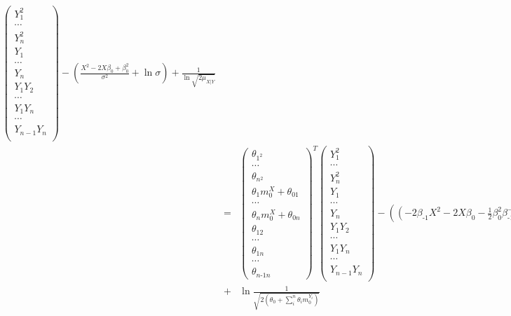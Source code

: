 \documentclass[11pt, oneside]{article}   	%
\numberwithin{figure}{section}
\numberwithin{equation}{section}
\numberwithin{table}{section}
\begin{document}
\begin{itemize}
\begin{eqnarray*}
\begin{pmatrix}
Y_1^2\\
\cdots\\
Y_n^2\\
Y_1\\
\cdots\\
Y_n\\
Y_1 Y_2\\
\cdots\\
Y_1 Y_n\\
\cdots\\
Y_{n-1}Y_{n}\\
\end{pmatrix}
- \left( \frac{X^2 -2X\beta_0 +\beta_0^2}{\sigma^2} + \ln{\sigma} \right) + \frac{1}{\ln{\sqrt{2\mu_{X|Y}}}}\\
&=&
\begin{pmatrix}
\theta_{1^2}\\
\cdots\\
\theta_{n^2}\\
\theta_1 m_0^X+\theta_{01}\\
\cdots\\
\theta_n m_0^X+\theta_{0n}\\
\theta_{12}\\
\cdots\\
\theta_{1n}\\
\cdots\\
\theta_{n\mbox{-}1n}
\end{pmatrix}^T
\begin{pmatrix}
Y_1^2\\
\cdots\\
Y_n^2\\
Y_1\\
\cdots\\
Y_n\\
Y_1 Y_2\\
\cdots\\
Y_1 Y_n\\
\cdots\\
Y_{n-1}Y_{n}\\
\end{pmatrix}
- \left( (-2\beta_{\mbox{-}1}X^2 - 2X\beta_0 - \frac{1}{2}\beta_0^2 \beta_{\mbox{-}1}^{-1}) + \frac{\ln{(2\theta_{\mbox{-}1}})}{2} \right)\\
&+&
\ln{\frac{1}{\sqrt{2(\theta_0+\sum_i^n\theta_i m_0^{Y_i})}}} 
\end{eqnarray*}

\end{itemize}


\newpage
\end{document}
